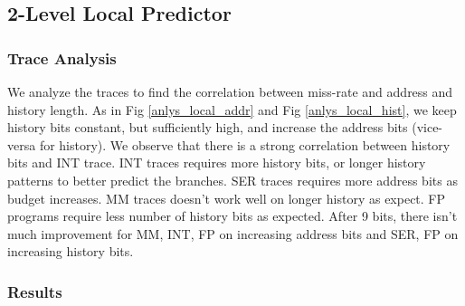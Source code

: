 \documentclass[conference]{IEEEtran}
\begin{document}
\subsection{2-Level Local Predictor}
\subsubsection{Trace Analysis}
We analyze the traces to find the correlation between miss-rate and address and history length. As in Fig \ref{anlys_local_addr} and Fig \ref{anlys_local_hist}, we keep history bits constant, but sufficiently high, and increase the address bits (vice-versa for history). We observe that there is a strong correlation between history bits and INT trace. INT traces requires more history bits, or longer history patterns to better predict the branches. SER traces requires more address bits as budget increases. MM traces doesn't work well on longer history as expect. FP programs require less number of history bits as expected. After 9 bits, there isn't much improvement for MM, INT, FP on increasing address bits and SER, FP on increasing history bits. 
\subsubsection{Results}
\end{document}
